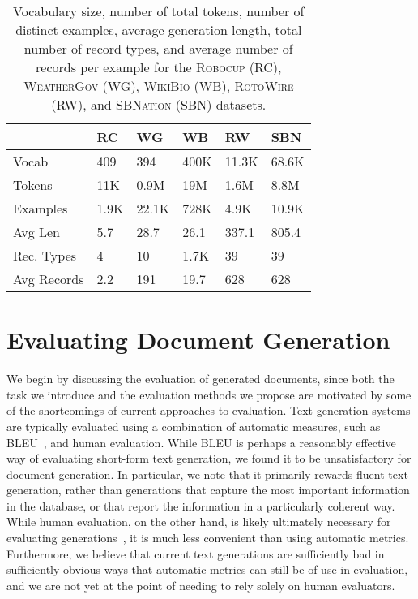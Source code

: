 \documentclass[11pt,letterpaper]{article}
\begin{document}
\begin{table}[t]
\centering
\small
\begin{tabular}{llllll}
\toprule
& \textsc{RC} &\textsc{WG} & \textsc{WB} & \textsc{RW}   & \textsc{SBN}\\
\midrule
Vocab   & 409   & 394 & 400K & 11.3K  & 68.6K \\
Tokens &  11K  & 0.9M  & 19M & 1.6M & 8.8M \\
Examples & 1.9K & 22.1K & 728K & 4.9K  & 10.9K \\
Avg Len & 5.7  &  28.7 & 26.1 & 337.1 & 805.4 \\   
Rec. Types & 4 & 10 & 1.7K & 39 & 39\\
Avg Records & 2.2 & 191 & 19.7 & 628 & 628\\
\bottomrule
\end{tabular}
\caption{Vocabulary size, number of total tokens, number of distinct examples, average generation length, total number of record types, and average number of records per example for the \textsc{Robocup} (RC), \textsc{WeatherGov} (WG), \textsc{WikiBio} (WB), \textsc{RotoWire} (RW), and \textsc{SBNation} (SBN) datasets.}
\label{tab:datastats}
\end{table}

\section{Evaluating Document Generation}
We begin by discussing the evaluation of generated documents, since both the task we introduce and the evaluation methods we propose are motivated by some of the shortcomings of current approaches to evaluation. Text generation systems are typically evaluated using a combination
of automatic measures, such as BLEU~\cite{papineni02bleu}, and human evaluation. While BLEU is perhaps a reasonably effective way of evaluating short-form text generation, we found it to be unsatisfactory
for document generation. In particular, we note that it primarily rewards fluent
text generation, rather than generations that capture the most important information in the database, or that report the information in a particularly coherent way. While human evaluation, on the other hand, is likely ultimately necessary for evaluating generations~\cite{liu2016how,wu2016google}, it is much less convenient than using automatic metrics. Furthermore, we believe that current text generations are sufficiently bad in sufficiently obvious ways that automatic metrics can still be of use in evaluation, and we are not yet at the point of needing to rely solely on human evaluators. 
\end{document}
